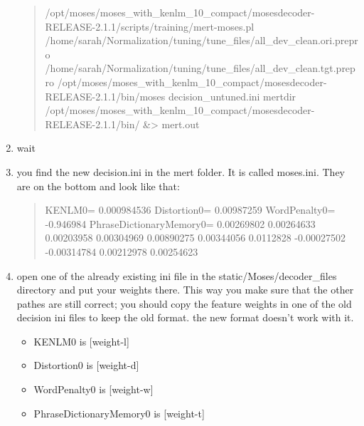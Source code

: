 \documentclass[letterpaper,10pt,english]{sphinxmanual}
\begin{document}
\begin{enumerate}
\begin{quote}
/opt/moses/moses\_with\_kenlm\_10\_compact/mosesdecoder-RELEASE-2.1.1/scripts/training/mert-moses.pl /home/sarah/Normalization/tuning/tune\_files/all\_dev\_clean.ori.prepro /home/sarah/Normalization/tuning/tune\_files/all\_dev\_clean.tgt.prepro /opt/moses/moses\_with\_kenlm\_10\_compact/mosesdecoder-RELEASE-2.1.1/bin/moses decision\_untuned.ini \textendash{}mertdir /opt/moses/moses\_with\_kenlm\_10\_compact/mosesdecoder-RELEASE-2.1.1/bin/ \&\textgreater{} mert.out
\end{quote}

\item {} 
wait

\item {} 
you find the new decision.ini in the mert folder. It is called moses.ini. They are on the bottom and look like that:
\begin{quote}

KENLM0= 0.000984536
Distortion0= 0.00987259
WordPenalty0= -0.946984
PhraseDictionaryMemory0= 0.00269802 0.00264633 0.00203958 0.00304969 0.00890275 0.00344056 0.0112828 -0.00027502 -0.00314784 0.00212978 0.00254623
\end{quote}

\item {} 
open one of the already existing ini file in the static/Moses/decoder\_files directory and put your weights there. This way you make sure that the other pathes are still correct; you should copy the feature weights in one of the old decision ini files to keep the old format. the new format doesn’t work with it.
\begin{itemize}
\item {} 
KENLM0 is {[}weight-l{]}

\item {} 
Distortion0 is {[}weight-d{]}

\item {} 
WordPenalty0 is {[}weight-w{]}

\item {} 
PhraseDictionaryMemory0 is {[}weight-t{]}

\end{itemize}

\end{enumerate}
\end{document}
